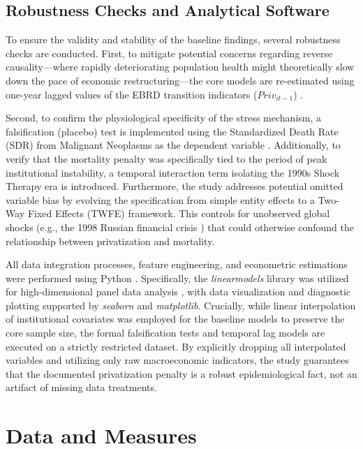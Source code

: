 \documentclass[en,magisterska]{pracamgr}
\begin{document}
\subsection{Robustness Checks and Analytical Software}

To ensure the validity and stability of the baseline findings, several robustness checks are conducted. First, to mitigate potential concerns regarding reverse causality—where rapidly deteriorating 
population health might theoretically slow down the pace of economic restructuring—the core models are re-estimated using one-year lagged values of the EBRD transition indicators ($Priv_{it-1}$) 
\citep{Gerry2012, Earle2013, Wooldridge2010}.

Second, to confirm the physiological specificity of the stress mechanism, a falsification (placebo) test is implemented using the Standardized Death Rate (SDR) from Malignant Neoplasms as the dependent variable \citep{Leon1997, Brainerd2005}. 
Additionally, to verify that the mortality penalty was specifically tied to the period of peak institutional instability, a temporal interaction term isolating the 1990s Shock Therapy era is introduced.
Furthermore, the study addresses potential omitted variable bias by evolving the specification from simple entity effects to a Two-Way Fixed Effects (TWFE) framework. This controls for unobserved global shocks 
(e.g., the 1998 Russian financial crisis \citep{EBRD1999}) that could otherwise confound the relationship between privatization and mortality. 

All data integration processes, feature engineering, and econometric estimations were performed using Python \citep{Python3}. Specifically, the \textit{linearmodels} library was utilized for high-dimensional 
panel data analysis \citep{Sheppard2021}, with data visualization and diagnostic plotting supported by \textit{seaborn} and \textit{matplotlib}. Crucially, while linear interpolation of institutional covariates 
was employed for the baseline models to preserve the core sample size, the formal falsification tests and temporal lag models are executed on a strictly restricted dataset. By explicitly dropping all interpolated 
variables and utilizing only raw macroeconomic indicators, the study guarantees that the documented privatization penalty is a robust epidemiological fact, not an artifact of missing data treatments.


\section{Data and Measures}
\end{document}
